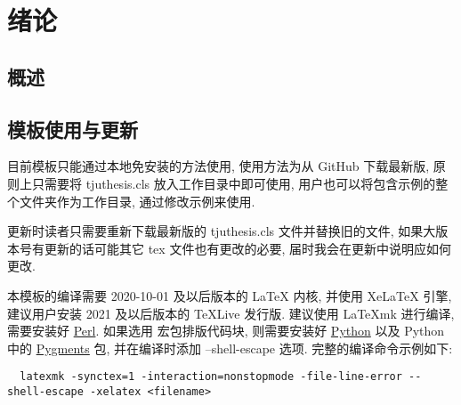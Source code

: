 
\section{绪论}

\subsection{概述}


\zhlipsum[1]

\subsection{模板使用与更新}

目前模板只能通过本地免安装的方法使用, 使用方法为从 GitHub 下载最新版, 原则上只需要将 tjuthesis.cls 放入工作目录中即可使用, 用户也可以将包含示例的整个文件夹作为工作目录, 通过修改示例来使用.

更新时读者只需要重新下载最新版的 tjuthesis.cls 文件并替换旧的文件, 如果大版本号有更新的话可能其它 tex 文件也有更改的必要, 届时我会在更新中说明应如何更改.

本模板的编译需要 2020-10-01 及以后版本的 LaTeX 内核, 并使用 XeLaTeX 引擎, 建议用户安装 2021 及以后版本的 TeXLive 发行版. 建议使用 LaTeXmk 进行编译, 需要安装好 \href{https://www.perl.org/get.html}{Perl}. 如果选用  宏包排版代码块, 则需要安装好 \href{https://wiki.python.org/moin/BeginnersGuide/Download}{Python} 以及 Python 中的 \href{https://pygments.org/download/}{Pygments} 包, 并在编译时添加 --shell-escape 选项. 完整的编译命令示例如下:
\begin{verbatim}
  latexmk -synctex=1 -interaction=nonstopmode -file-line-error --shell-escape -xelatex <filename>
\end{verbatim}
